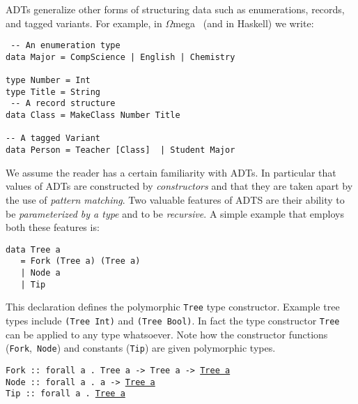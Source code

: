 \documentclass{sigplanconf}
\newcommand{\om}{$\Omega$mega}
\begin{document}
ADTs generalize other forms of structuring data such as enumerations,
records, and tagged variants. For example,
in \om~ (and in Haskell) we write:

\begin{verbatim}
 -- An enumeration type
data Major = CompScience | English | Chemistry    

type Number = Int
type Title = String
 -- A record structure
data Class = MakeClass Number Title  

-- A tagged Variant
data Person = Teacher [Class]  | Student Major    
\end{verbatim}

We assume the reader has a certain familiarity with ADTs. In
particular that values of ADTs are constructed by {\em constructors}
and that they are taken apart by the use of {\em pattern matching}.
Two valuable features of ADTS are their ability to be {\em
parameterized by a type} and to be {\em recursive}. A simple example
that employs both these features is:
\begin{verbatim}
data Tree a 
   = Fork (Tree a) (Tree a) 
   | Node a 
   | Tip
\end{verbatim}
This declaration defines the polymorphic {\tt Tree} type constructor. Example tree
types include {\tt (Tree Int)} and {\tt (Tree Bool)}. In fact the
type constructor {\tt Tree} can be applied to any type whatsoever.
Note how the constructor functions ({\tt Fork},\ {\tt Node}) and constants ({\tt Tip})
are given polymorphic types.

\vspace*{0.1in}
\noindent 
{\tt Fork :: forall a . Tree a -> Tree a -> \underline{Tree a}}\\
{\tt Node :: forall a . a -> \underline{Tree a}}\\
{\tt Tip :: forall a . \underline{Tree a}}
 \vspace*{0.1in}
 
\end{document}
